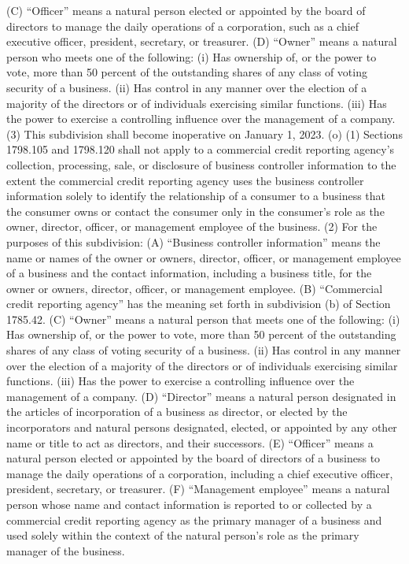 (C) “Officer” means a natural person elected or appointed by the board of directors to manage the daily operations of a corporation, such as a chief executive officer, president, secretary, or treasurer.
(D) “Owner” means a natural person who meets one of the following:
(i) Has ownership of, or the power to vote, more than 50 percent of the outstanding shares of any class of voting security of a business.
(ii) Has control in any manner over the election of a majority of the directors or of individuals exercising similar functions.
(iii) Has the power to exercise a controlling influence over the management of a company.
(3) This subdivision shall become inoperative on January 1, 2023.
(o) (1) Sections 1798.105 and 1798.120 shall not apply to a commercial credit reporting agency’s collection, processing, sale, or disclosure of business controller information to the extent the commercial credit reporting agency uses the business controller information solely to identify the relationship of a consumer to a business that the consumer owns or contact the consumer only in the consumer’s role as the owner, director, officer, or management employee of the business.
(2) For the purposes of this subdivision:
(A) “Business controller information” means the name or names of the owner or owners, director, officer, or management employee of a business and the contact information, including a business title, for the owner or owners, director, officer, or management employee.
(B) “Commercial credit reporting agency” has the meaning set forth in subdivision (b) of Section 1785.42.
(C) “Owner” means a natural person that meets one of the following:
(i) Has ownership of, or the power to vote, more than 50 percent of the outstanding shares of any class of voting security of a business.
(ii) Has control in any manner over the election of a majority of the directors or of individuals exercising similar functions.
(iii) Has the power to exercise a controlling influence over the management of a company.
(D) “Director” means a natural person designated in the articles of incorporation of a business as director, or elected by the incorporators and natural persons designated, elected, or appointed by any other name or title to act as directors, and their successors.
(E) “Officer” means a natural person elected or appointed by the board of directors of a business to manage the daily operations of a corporation, including a chief executive officer, president, secretary, or treasurer.
(F) “Management employee” means a natural person whose name and contact information is reported to or collected by a commercial credit reporting agency as the primary manager of a business and used solely within the context of the natural person’s role as the primary manager of the business.

